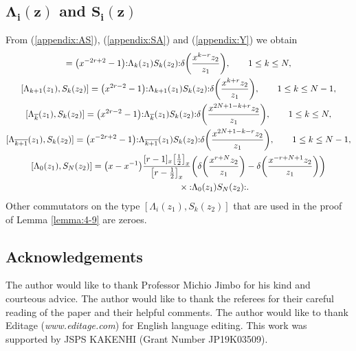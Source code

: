 \documentclass[10pt,a4paper]{amsart}
\numberwithin{equation}{section}
\begin{document}
\subsection[\protect{$Lambda\_\{i\}(z)$} and \protect{$S\_\{i\}(z)$}]
{$\boldsymbol{\Lambda_i(z)}$ and $\boldsymbol {S_i(z)}$}
From (\ref{appendix:AS}), (\ref{appendix:SA}) and (\ref{appendix:Y}) we obtain
\begin{gather}
[\Lambda_k(z_1),S_k(z_2)]=\big(x^{-2r+2}-1\big){:}\Lambda_k(z_1)S_k(z_2){:}
\delta\bigg(\frac{x^{k-r}z_2}{z_1}\bigg),\qquad
1\leq k \leq N,\nonumber
\\
[\Lambda_{k+1}(z_1),S_k(z_2)]=\big(x^{2r-2}-1\big){:}\Lambda_{k+1}(z_1)S_k(z_2){:}
\delta\bigg(\frac{x^{k+r}z_2}{z_1}\bigg),\qquad
1\leq k \leq N-1,\nonumber
\\
[\Lambda_{\overline{k}}(z_1),S_k(z_2)]=\big(x^{2r-2}-1\big)
{:}\Lambda_{\overline{k}}(z_1)S_k(z_2){:}
\delta\bigg(\frac{x^{2N+1-k+r}z_2}{z_1}\bigg),\qquad 1\leq k \leq N,
\nonumber
\\
[\Lambda_{\overline{k+1}}(z_1),S_k(z_2)]=\big(x^{-2r+2}-1\big)
{:}\Lambda_{\overline{k+1}}(z_1)S_k(z_2){:}
\delta\bigg(\frac{x^{{2N+1-k-r}}z_2}{z_1}\bigg),\qquad
1\leq k \leq N-1,\nonumber
\\
[\Lambda_0(z_1),S_N(z_2)]={\big(x-x^{-1}\big)}
\frac{[r-1]_x\big[\frac{1}{2}\big]_x}{\big[r-\frac{1}{2}\big]_x}
\bigg(\delta\bigg(\frac{x^{r+N}z_2}{z_1}\bigg)
-\delta\bigg(\frac{x^{-r+N+1}z_2}{z_1}\bigg)\bigg)\nonumber
\\ \hphantom{[\Lambda_0(z_1),S_N(z_2)]=}
{}\times{:}\Lambda_0(z_1)S_N(z_2){:}.
\label{exchange:Lambda-S}
\end{gather}
Other commutators on the type $[\Lambda_i(z_1), S_k(z_2)]$
that are used in the proof of Lemma \ref{lemma:4-9} are zeroes.

\subsection*{Acknowledgements}

The author would like to thank Professor Michio Jimbo
for his kind and courteous advice.
The author would like to thank the referees
for their careful reading of the paper and their helpful comments.
The author would like to thank Editage ({\it www.editage.com}) for English language editing.
This work was supported by
JSPS KAKENHI (Grant Number JP19K03509).

%
%

\end{document}
